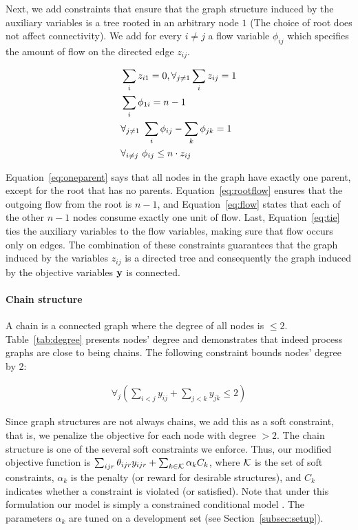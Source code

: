 Next, we add constraints that ensure that the graph structure induced by the auxiliary variables is a tree rooted in an arbitrary node $1$ (The choice of root does not affect connectivity). We add for every $i \neq j$ a flow variable $\phi_{ij}$ which specifies the amount of flow on the directed edge $z_{ij}$.

\begin{align}
\small &\sum_{i} z_{i1} =0, \forall_{j \neq 1} \sum_{i} z_{ij}=1 \label{eq:oneparent} \\ 
&\sum_{i} \phi_{1i}=n-1 \label{eq:rootflow} \\ 
&\forall_{j \neq 1} \ \sum_{i} \phi_{ij} - \sum_{k} \phi_{jk}=1 \label{eq:flow} \\
&\forall_{i \neq j} \ \phi_{ij} \leq n \cdot z_{ij} \label{eq:tie} 
\end{align}

Equation~\ref{eq:oneparent} says that all nodes in the graph have exactly one parent, except for the root that has no parents. Equation~\ref{eq:rootflow} ensures that the outgoing flow from the root is $n-1$, and Equation~\ref{eq:flow} states that each of the other $n-1$ nodes consume exactly one unit of flow. Last, Equation~\ref{eq:tie} ties the auxiliary variables to the flow variables, making sure that flow occurs only on edges. The combination of these constraints guarantees that the graph induced by the variables $z_{ij}$ is a directed tree and consequently the graph induced by the objective variables $\mathbf{y}$ is connected.

\paragraph{Chain structure} 
A chain is a connected graph where the degree of all nodes is $\leq 2$. Table~\ref{tab:degree} presents nodes' degree and demonstrates that indeed process graphs are close to being chains. The following constraint bounds nodes' degree by 2:

\begin{align}
\forall_j (\sum_{i<j} y_{ij} + \sum_{j<k} y_{jk} \leq 2)
\end{align}

Since graph structures are not always chains, we add this as a soft constraint, that is, we penalize the objective for each node with degree $>2$. The chain structure is one of the several soft constraints we enforce. Thus, our modified objective function is $\sum_{ijr} \theta_{ijr} y_{ijr} + \sum_{k \in \mathcal{K}} \alpha_k C_k$, where $\mathcal{K}$ is the set of soft constraints, $\alpha_k$ is the penalty (or reward for desirable structures), and $C_k$ indicates whether a constraint is violated (or satisfied). Note that under this formulation our model is simply a constrained conditional model \cite{ChangRaRo12}. The parameters $\alpha_k$ are tuned on a development set (see Section~\ref{subsec:setup}).


